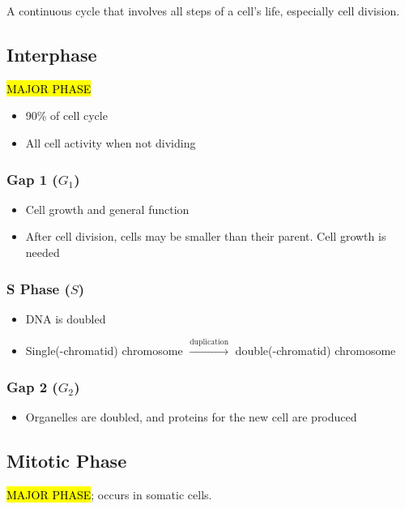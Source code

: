 \documentclass[a4paper,12pt]{article}
\begin{document}
A continuous cycle that involves all steps of a cell's life, especially cell division.

\subsection{Interphase}

\hl{MAJOR PHASE}

\begin{itemize}
    \item{90\% of cell cycle}
    \item{All cell activity when not dividing}
\end{itemize}

\subsubsection{Gap 1 ($G_1$)}
\begin{itemize}
    \item{Cell growth and general function}
    \item{After cell division, cells may be smaller than their parent. Cell growth is needed}
\end{itemize}

\subsubsection{S Phase ($S$)}
\begin{itemize}
    \item{DNA is doubled}
    \item{Single(-chromatid) chromosome $\xrightarrow{\textrm{duplication}}$ double(-chromatid) chromosome}
\end{itemize}

\subsubsection{Gap 2 ($G_2$)}
\begin{itemize}
    \item{Organelles are doubled, and proteins for the new cell are produced}
\end{itemize}

\pagebreak

\subsection{Mitotic Phase}\noindent

\hl{MAJOR PHASE}; occurs in somatic cells.
\end{document}
